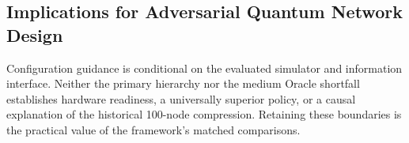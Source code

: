 \subsection{Implications for Adversarial Quantum Network Design}

Configuration guidance is conditional on the evaluated simulator and information interface. Neither the primary hierarchy nor the medium Oracle shortfall establishes hardware readiness, a universally superior policy, or a causal explanation of the historical 100-node compression. Retaining these boundaries is the practical value of the framework's matched comparisons.



